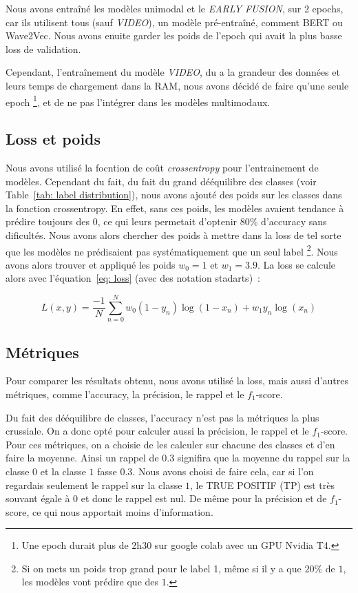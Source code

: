 Nous avons entraîné les modèles unimodal et le \textit{EARLY FUSION}, sur 2 epochs, car ils utilisent tous (sauf \textit{VIDEO}), 
un modèle pré-entraîné, comment BERT ou Wave2Vec. Nous avons enuite garder les poids de 
l'epoch qui avait la plus basse loss de validation.

Cependant, l'entraînement du modèle \textit{VIDEO}, du a la grandeur des données et 
leurs temps de chargement dans la RAM, nous avons décidé de faire qu'une seule epoch
\footnote{Une epoch durait plus de 2h30 sur google colab avec un GPU Nvidia T4.}, et de ne pas l'intégrer dans les modèles multimodaux.

\subsection{Loss et poids}
Nous avons utilisé la focntion de coût \textit{crossentropy} pour l'entrainement de modèles. 
Cependant du fait, du fait du grand dééquilibre des classes (voir Table~\ref{tab: label distribution}), nous avons ajouté des poids 
sur les classes dans la fonction crossentropy. En effet, sans ces poids, les modèles avaient tendance à prédire toujours des $0$, ce 
qui leurs permetait d'optenir $80\%$ d'accuracy sans dificultés. Nous avons alors chercher des poids à mettre dans la loss de tel sorte 
que les modèles ne prédisaient pas systématiquement que un seul label
\footnote{Si on mets un poids trop grand pour le label 1, même si il y a que $20\%$ de $1$, les modèles vont prédire que des $1$.}.
Nous avons alors trouver et appliqué les poids $w_0 = 1$ et $w_1=3.9$. La loss se calcule alors avec l'équation~\ref{eq: loss}
(avec des notation stadarts)~:

\begin{equation}
    L(x, y) = \frac{-1}{N} \sum_{n=0}^{N} w_0 (1-y_n) \log(1-x_n) + w_1 y_n \log(x_n)
    \label{eq: loss}
\end{equation}

\subsection{Métriques}
Pour comparer les résultats obtenu, nous avons utilisé la loss, mais aussi d'autres métriques,
comme l'accuracy, la précision, le rappel et le $f_1$-score.

Du fait des dééquilibre de classes, l'accuracy n'est pas la métriques la plus crussiale. On a donc opté pour 
calculer aussi la précision, le rappel et le $f_1$-score. Pour ces métriques, on a choisie de les calculer 
sur chacune des classes et d'en faire la moyenne. Ainsi un rappel de $0.3$ signifira que la moyenne du rappel sur
la classe $0$ et la classe $1$ fasse $0.3$. Nous avons choisi de faire cela, car si l'on regardais seulement 
le rappel sur la classe $1$, le TRUE POSITIF (TP) est très souvant égale à $0$ et donc le rappel est nul. De même 
pour la précision et de $f_1$-score, ce qui nous apportait moins d'information.